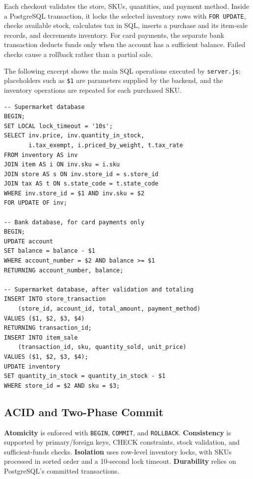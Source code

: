 \documentclass[11pt,letterpaper]{article}
\begin{document}
Each checkout validates the store, SKUs, quantities, and payment method. Inside a PostgreSQL transaction, it locks the selected inventory rows with \texttt{FOR UPDATE}, checks available stock, calculates tax in SQL, inserts a purchase and its item-sale records, and decrements inventory. For card payments, the separate bank transaction deducts funds only when the account has a sufficient balance. Failed checks cause a rollback rather than a partial sale.

The following excerpt shows the main SQL operations executed by \texttt{server.js}; placeholders such as \texttt{\$1} are parameters supplied by the backend, and the inventory operations are repeated for each purchased SKU.

\begin{lstlisting}
-- Supermarket database
BEGIN;
SET LOCAL lock_timeout = '10s';
SELECT inv.price, inv.quantity_in_stock,
       i.tax_exempt, i.priced_by_weight, t.tax_rate
FROM inventory AS inv
JOIN item AS i ON inv.sku = i.sku
JOIN store AS s ON inv.store_id = s.store_id
JOIN tax AS t ON s.state_code = t.state_code
WHERE inv.store_id = $1 AND inv.sku = $2
FOR UPDATE OF inv;

-- Bank database, for card payments only
BEGIN;
UPDATE account
SET balance = balance - $1
WHERE account_number = $2 AND balance >= $1
RETURNING account_number, balance;

-- Supermarket database, after validation and totaling
INSERT INTO store_transaction
    (store_id, account_id, total_amount, payment_method)
VALUES ($1, $2, $3, $4)
RETURNING transaction_id;
INSERT INTO item_sale
    (transaction_id, sku, quantity_sold, unit_price)
VALUES ($1, $2, $3, $4);
UPDATE inventory
SET quantity_in_stock = quantity_in_stock - $1
WHERE store_id = $2 AND sku = $3;
\end{lstlisting}

\subsection{ACID and Two-Phase Commit}

\textbf{Atomicity} is enforced with \texttt{BEGIN}, \texttt{COMMIT}, and \texttt{ROLLBACK}. \textbf{Consistency} is supported by primary/foreign keys, CHECK constraints, stock validation, and sufficient-funds checks. \textbf{Isolation} uses row-level inventory locks, with SKUs processed in sorted order and a 10-second lock timeout. \textbf{Durability} relies on PostgreSQL's committed transactions.
\end{document}
